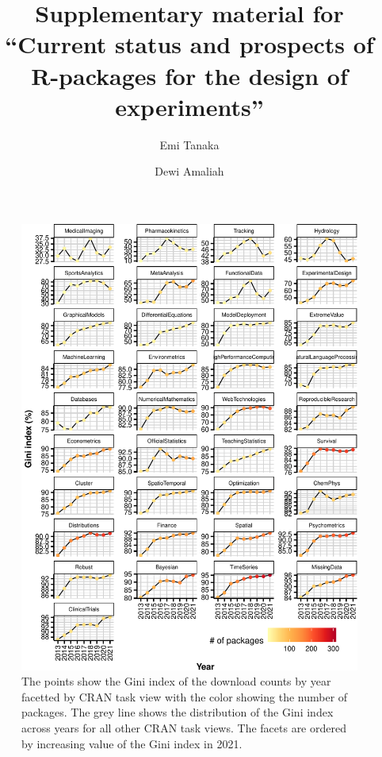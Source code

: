\documentclass[
]{article}
\title{Supplementary material for ``Current status and prospects of R-packages for the design of experiments''}
\author{Emi Tanaka \and Dewi Amaliah}
\date{}
\begin{document}
\maketitle

\begin{figure}[htbp]

{\centering \includegraphics{figures/fig-gini-all-ctvs-1} 

}

\caption{The points show the Gini index of the download counts by year facetted by CRAN task view with the color showing the number of packages. The grey line shows the distribution of the Gini index across years for all other CRAN task views. The facets are ordered by increasing value of the Gini index in 2021.}\label{fig:fig-gini-all-ctvs}
\end{figure}
\end{document}
